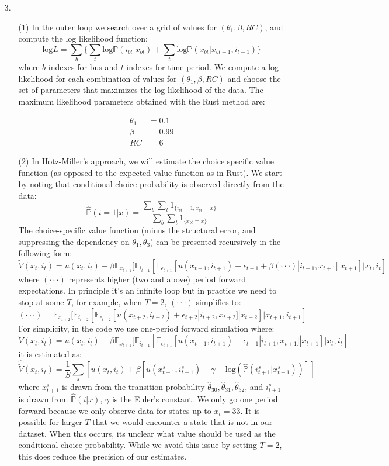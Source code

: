 \documentclass[paper=a4, fontsize=11pt]{scrartcl} %
\numberwithin{equation}{section} %
\numberwithin{figure}{section} %
\numberwithin{table}{section} %
\begin{document}
\begin{itemize}
\begin{itemize}
\end{itemize}

\item[3.]
\begin{itemize}
\item[(1)] In the outer loop we search over a grid of values for $(\theta_1, \beta, RC)$, and compute the log likelihood function:
\[\text{log}L = \sum_{b} \{\sum_{t} \text{log} \mathbb{P}(i_{bt}|x_{bt}) + \sum_t \text{log} \mathbb{P}(x_{bt}|x_{bt-1},i_{t-1})\}\]
where $b$ indexes for bus and $t$ indexes for time period. We compute a log likelihood for each combination of values for $(\theta_1, \beta, RC)$ and choose the set of parameters that maximizes the log-likelihood of the data. The maximum likelihood parameters obtained with the Rust method are:

\begin{eqnarray*}
\theta_1 & = 0.1 \\
\beta & = 0.99 \\
RC & = 6
\end{eqnarray*}

\item[(2)] In Hotz-Miller's approach, we will estimate the choice specific value function (as opposed to the expected value function as in Rust). We start by noting that conditional choice probability is observed directly from the data:
\[\hat{\mathbb{P}}(i=1|x) = \frac{\sum_{b}\sum_{t} 1_{\{i_{bt}=1, x_{bt}=x\}}}{\sum_{b}\sum_{t} 1_{\{x_{bt}=x\}}}\]
The choice-specific value function (minus the structural error, and suppressing the dependency on $\theta_1, \theta_3$) can be presented recursively in the following form:
\[\tilde{V}(x_t,i_t) = u(x_t,i_t)+\beta\mathbb{E}_{x_{t+1}}[\mathbb{E}_{i_{t+1}}[\mathbb{E}_{\epsilon_{t+1}}[u(x_{t+1},i_{t+1})+\epsilon_{t+1}+\beta(\cdot\cdot\cdot)|i_{t+1},x_{t+1}]|x_{t+1}]|x_t,i_t]\]
where $(\cdot\cdot\cdot)$ represents higher (two and above) period forward expectations. In principle it's an infinite loop but in practice we need to stop at some $T$, for example, when $T=2$, $(\cdot\cdot\cdot)$ simplifies to:
\[(\cdot\cdot\cdot) = \mathbb{E}_{x_{t+2}}[\mathbb{E}_{i_{t+2}}[\mathbb{E}_{\epsilon_{t+2}}[u(x_{t+2},i_{t+2})+\epsilon_{t+2}|i_{t+2},x_{t+2}]|x_{t+2}]|x_{t+1},i_{t+1}]\]
For simplicity, in the code we use one-period forward simulation where:
\[\tilde{V}(x_t,i_t) = u(x_t,i_t)+\beta\mathbb{E}_{x_{t+1}}[\mathbb{E}_{i_{t+1}}[\mathbb{E}_{\epsilon_{t+1}}[u(x_{t+1},i_{t+1})+\epsilon_{t+1}|i_{t+1},x_{t+1}]|x_{t+1}]|x_t,i_t]\]
it is estimated as:
\[\hat{\tilde{V}}(x_t,i_t) = \frac{1}{S} \sum_{s} [u(x_t,i_t)+\beta[u(x^s_{t+1},i^s_{t+1})+\gamma -\text{log}(\hat{\mathbb{P}}(i^s_{t+1}|x^s_{t+1}))]]\]
where $x^s_{t+1}$ is drawn from the transition probability $\hat{\theta}_{30}, \hat{\theta}_{31}, \hat{\theta}_{32}$, and $i^s_{t+1}$ is drawn from $\hat{\mathbb{P}}(i|x)$, $\gamma$ is the Euler's constant. We only go one period forward because we only observe data for states up to $x_t = 33$. It is possible for larger $T$ that we would encounter a state that is not in our dataset. When this occurs, its unclear what value should be used as the conditional choice probability. While we avoid this issue by setting $T = 2$, this does reduce the precision of our estimates.


\end{itemize}
\end{itemize}
\end{document}
